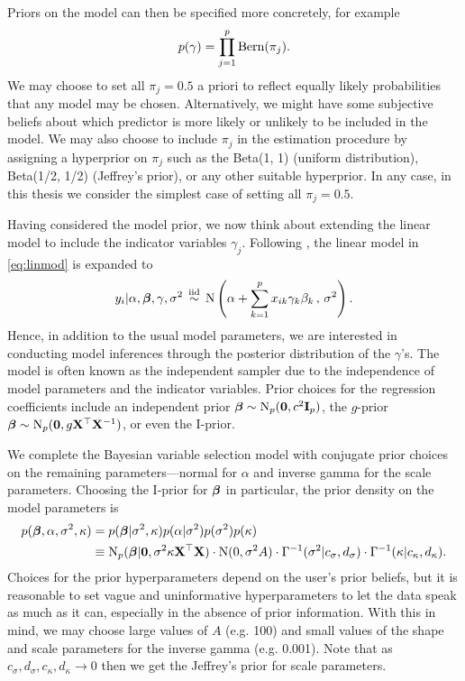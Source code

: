 \documentclass[a4paper,showframe,11pt]{report}
\begin{document}
Priors on the model can then be specified more concretely, for example 
\begin{equation}\label{eq:priorgamma}
  p(\gamma) = \prod_{j=1}^p \operatorname{Bern}(\pi_j).
\end{equation}
We may choose to set all $\pi_j = 0.5$ a priori to reflect equally likely probabilities that any model may be chosen.
Alternatively, we might have some subjective beliefs about which predictor is more likely or unlikely to be included in the model.
We may also choose to include $\pi_j$ in the estimation procedure by assigning a hyperprior on $\pi_j$ such as the Beta(1, 1) (uniform distribution), Beta(1/2, 1/2) (Jeffrey's prior), or any other suitable hyperprior.
In any case, in this thesis we consider the simplest case of setting all $\pi_j = 0.5$.

Having considered the model prior, we now think about extending the linear model to include the indicator variables $\gamma_j$.
Following \citet{Kuo1998}, the linear model in \cref{eq:linmod} is expanded to
\begin{align}\label{eq:km}
  \begin{gathered}
    y_i|\alpha,{\bm\beta},\gamma,\sigma^2 \,\overset{\text{iid}}{\sim}\, \operatorname{N} \left( \alpha + \sum_{k=1}^p x_{ik}\gamma_k\beta_k \, , \, \sigma^2 \right).
  \end{gathered}  
\end{align} 
Hence, in addition to the usual model parameters, we are interested in conducting model inferences through the posterior distribution of the $\gamma$'s.
The \citeauthor{Kuo1998} model is often known as the independent sampler due to the independence of model parameters and the indicator variables.
Prior choices for the regression coefficients include an independent prior ${\bm\beta}\sim\operatorname{N}_p({\mathbf 0},c^2{\mathbf I}_p)$, the $g$-prior ${\bm\beta}\sim\operatorname{N}_p({\mathbf 0},g\mathbf X^\top \mathbf X^{-1})$, or even the I-prior.

We complete the Bayesian variable selection model with conjugate prior choices on the remaining parameters---normal for $\alpha$ and inverse gamma for the scale parameters.
Choosing the I-prior for ${\bm\beta}$ in particular, the prior density on the model parameters is
\begin{align}
    p({\bm\beta},\alpha,\sigma^2,\kappa) 
    &= p({\bm\beta}|\sigma^2,\kappa)p(\alpha|\sigma^2)p(\sigma^2)p(\kappa) \nonumber \\
    &\equiv \operatorname{N}_p({\bm\beta}|{\mathbf 0},\sigma^2\kappa \mathbf X^\top \mathbf X) \cdot \operatorname{N}(0,\sigma^2 A) \cdot \Gamma^{-1}(\sigma^2|c_\sigma,d_\sigma) \cdot \Gamma^{-1}(\kappa|c_\kappa,d_\kappa).
\end{align}
Choices for the prior hyperparameters depend on the user's prior beliefs, but it is reasonable to set vague and uninformative hyperparameters to let the data speak as much as it can, especially in the absence of prior information. 
With this in mind, we may choose large values of $A$ (e.g. 100) and small values of the shape and scale parameters for the inverse gamma (e.g. 0.001). 
Note that as $c_\sigma,d_\sigma,c_\kappa,d_\kappa \to 0$ then we get the Jeffrey's prior for scale parameters.
\end{document}
